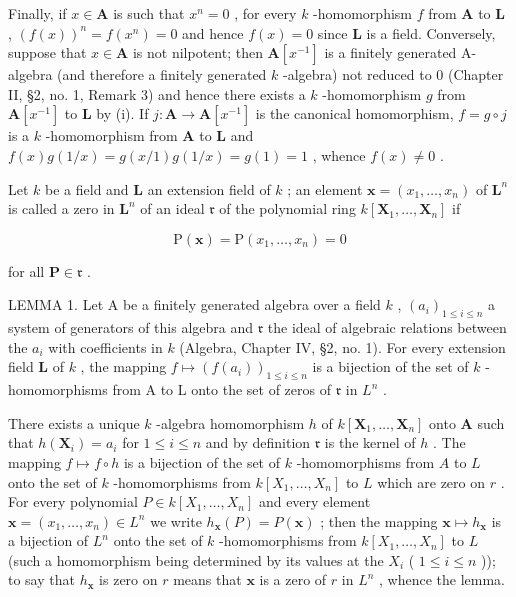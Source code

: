 Finally, if \(x \in \mathbf{A}\) is such that \(x^n = 0\) , for every \(k\) -homomorphism \(f\) from \(\mathbf{A}\) to \(\mathbf{L}\) , \((f(x))^n = f(x^n) = 0\) and hence \(f(x) = 0\) since \(\mathbf{L}\) is a field. Conversely, suppose that \(x \in \mathbf{A}\) is not nilpotent; then \(\mathbf{A}[x^{-1}]\) is a finitely generated A-algebra (and therefore a finitely generated \(k\) -algebra) not reduced to 0 (Chapter II, §2, no. 1, Remark 3) and hence there exists a \(k\) -homomorphism \(g\) from \(\mathbf{A}[x^{-1}]\) to \(\mathbf{L}\) by (i). If \(j: \mathbf{A} \to \mathbf{A}[x^{-1}]\) is the canonical homomorphism, \(f = g \circ j\) is a \(k\) -homomorphism from \(\mathbf{A}\) to \(\mathbf{L}\) and \(f(x)g(1/x) = g(x/1)g(1/x) = g(1) = 1\) , whence \(f(x) \neq 0\) .

Let \(k\) be a field and \(\mathbf{L}\) an extension field of \(k\) ; an element \(\mathbf{x} = (x_1, \ldots, x_n)\) of \(\mathbf{L}^n\) is called a zero in \(\mathbf{L}^n\) of an ideal \(\mathfrak{r}\) of the polynomial ring \(k[\mathbf{X}_1, \ldots, \mathbf{X}_n]\) if

\[
\mathrm{P} (\mathbf {x}) = \mathrm{P} (x _ {1}, \dots , x _ {n}) = 0
\]

for all \(\mathbf{P} \in \mathfrak{r}\) .

LEMMA 1. Let A be a finitely generated algebra over a field \(k\) , \((a_i)_{1 \leqslant i \leqslant n}\) a system of generators of this algebra and \(\mathfrak{r}\) the ideal of algebraic relations between the \(a_i\) with coefficients in \(k\) (Algebra, Chapter IV, §2, no. 1). For every extension field \(\mathbf{L}\) of \(k\) , the mapping \(f \mapsto (f(a_i))_{1 \leqslant i \leqslant n}\) is a bijection of the set of \(k\) -homomorphisms from A to L onto the set of zeros of \(\mathfrak{r}\) in \(L^n\) .

There exists a unique \(k\) -algebra homomorphism \(h\) of \(k[\mathbf{X}_1, \ldots, \mathbf{X}_n]\) onto \(\mathbf{A}\) such that \(h(\mathbf{X}_i) = a_i\) for \(1 \leqslant i \leqslant n\) and by definition \(\mathfrak{r}\) is the kernel of \(h\) . The mapping \(f \mapsto f \circ h\) is a bijection of the set of \(k\) -homomorphisms from \(A\) to \(L\) onto the set of \(k\) -homomorphisms from \(k[X_1, \ldots, X_n]\) to \(L\) which are zero on \(r\) . For every polynomial \(P \in k[X_1, \ldots, X_n]\) and every element \(\mathbf{x} = (x_1, \ldots, x_n) \in L^n\) we write \(h_{\mathbf{x}}(P) = P(\mathbf{x})\) ; then the mapping \(\mathbf{x} \mapsto h_{\mathbf{x}}\) is a bijection of \(L^n\) onto the set of \(k\) -homomorphisms from \(k[X_1, \ldots, X_n]\) to \(L\) (such a homomorphism being determined by its values at the \(X_i\) ( \(1 \leqslant i \leqslant n\) )); to say that \(h_{\mathbf{x}}\) is zero on \(r\) means that \(\mathbf{x}\) is a zero of \(r\) in \(L^n\) , whence the lemma.

